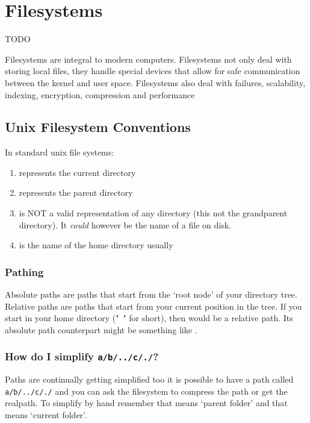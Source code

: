 \chapter{Filesystems}

\epigraph{TODO}{}

Filesystems are integral to modern computers. Filesystems not only deal with storing local files, they handle special devices that allow for safe communication between the kernel and user space. Filesystems also deal with failures, scalability, indexing, encryption, compression and performance


\section{Unix Filesystem Conventions}

In standard unix file systems: 

\begin{enumerate}

\item {} represents the current directory
\item {} represents the parent directory
\item {} is NOT a valid representation of any directory (this not the grandparent directory). It \emph{could} however be the name of a file on disk.
\item \keyword{~} is the name of the home directory usually
\end{enumerate}

\subsection{Pathing}

Absolute paths are paths that start from the `root node' of your directory tree. Relative paths are paths that start from your current position in the tree. If you start in your home directory ("~" for short), then  would be a relative path. Its absolute path counterpart might be something like .

\subsection{\texorpdfstring{How do I simplify \texttt{a/b/../c/./}?}{How do I simplify a/b/../c/./?}}\label{how-do-i-simplify-ab..c.}

Paths are continually getting simplified too it is possible to have a path called \texttt{a/b/../c/./} and you can ask the filesystem to compress the path or get the realpath. To simplify by hand remember that  means `parent folder' and that  means `current folder'.


